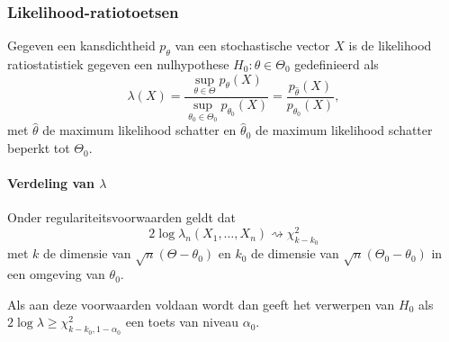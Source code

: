 \subsubsection{Likelihood-ratiotoetsen}
Gegeven een kansdichtheid \(p_{\theta}\) van een stochastische vector \(X\) is
de likelihood ratiostatistiek gegeven een nulhypothese \(H_{0}:\theta\in\Theta_{0}\)
gedefinieerd als
\[
    \lambda(X)=\frac{\sup_{\theta\in\Theta}p_{\theta}(X)}
    {\sup_{\theta_{0}\in\Theta_{0}}p_{\theta_{0}}(X)}=
    \frac{p_{\hat{\theta}}(X)}{p_{\hat{\theta}_{0}}(X)},
\]
met \(\hat{\theta}\) de maximum likelihood schatter en \(\hat{\theta}_{0}\) de
maximum likelihood schatter beperkt tot \(\Theta_{0}\).

\paragraph{Verdeling van \texorpdfstring{\(\lambda\)}{ll}} Onder
regulariteitsvoorwaarden geldt dat
\[
    2\log\lambda_{n}(X_{1},\dots,X_{n})\rightsquigarrow\chi^{2}_{k-k_{0}}
\]
met \(k\) de dimensie van \(\sqrt{n}(\Theta-\theta_{0})\) en \(k_{0}\) de
dimensie van \(\sqrt{n}(\Theta_{0}-\theta_{0})\) in een omgeving van
\(\theta_{0}\).

Als aan deze voorwaarden voldaan wordt dan geeft het verwerpen van \(H_{0}\) als
\(2\log\lambda\geq\chi^{2}_{k-k_{0},1-\alpha_{0}}\) een toets van niveau
\(\alpha_{0}\).